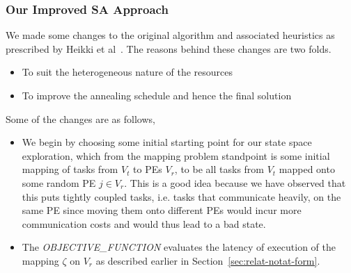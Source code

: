 \subsubsection{Our Improved SA Approach}

We made some changes to the original algorithm and associated heuristics as
prescribed by Heikki et al~\cite{hors06}. The reasons behind these changes are two folds.
\begin{itemize}
\item To suit the heterogeneous nature of the resources
\item To improve the annealing schedule and hence the final solution
\end{itemize}

Some of the changes are as follows,

\begin{itemize}

\item We begin by choosing some initial starting point for our state space exploration, which from
the mapping problem standpoint is some initial mapping of tasks from $V_t$ to
PEs $V_r$, to be all tasks from $V_t$ mapped onto
some random PE $j \in V_r$. This is a good idea because we have observed that
this puts tightly coupled tasks, i.e. tasks that communicate heavily, on the
same PE since moving them onto different PEs would incur more communication
costs and would thus lead to a bad state.

\item The \textit{OBJECTIVE\_FUNCTION} evaluates the latency of execution of
the mapping $\zeta$ on $V_r$ as described earlier in
Section~\ref{sec:relat-notat-form}. 


\end{itemize}
